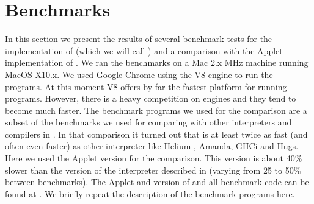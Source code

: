\section{Benchmarks} \label{sapljs:sec:benchmarks}
In this section we present the results of several benchmark tests for the  \JavaScript implementation of \Sapl (which we will call \Sapljs) and a
comparison with the \Java Applet implementation of \Sapl. 
We ran the benchmarks on a Mac 2.x MHz machine running MacOS X10.x.
We used Google Chrome using the V8 \JavaScript engine to run the programs.
At this moment V8 offers by far the fastest platform for running \Sapljs programs.
However, there is a heavy competition on \JavaScript engines and they tend to become much faster.
The benchmark programs we used for the comparison are a subset of the benchmarks  we used for comparing 
\Sapl with other interpreters and compilers in \cite{JKP}. In that comparison it turned out that \Sapl is at least twice as fast (and often even faster)
as other interpreter like \textsf{Helium} , \textsf{Amanda}, \textsf{GHCi} and \textsf{Hugs}.
Here we used the \Java Applet version for the comparison. This version is about 40\% slower than the \C  version
of the interpreter described in \cite{JKP} (varying from 25 to 50\% between benchmarks).
The \Java Applet and \JavaScript  version of  \Sapl  and all benchmark code can be found at \cite{SAPL}.
We briefly repeat the description of the benchmark programs here.

